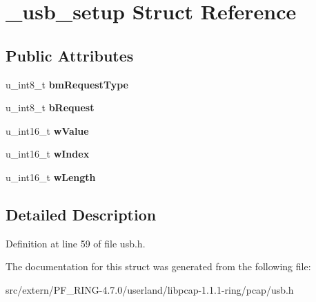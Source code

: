 \hypertarget{struct__usb__setup}{
\section{\_\-usb\_\-setup Struct Reference}
\label{struct__usb__setup}
}
\subsection*{Public Attributes}
\begin{DoxyCompactItemize}
\item 
\hypertarget{struct__usb__setup_a9e17a96ce6bba41e99f19992f541e768}{
u\_\-int8\_\-t {\bfseries bmRequestType}}
\label{struct__usb__setup_a9e17a96ce6bba41e99f19992f541e768}

\item 
\hypertarget{struct__usb__setup_ac1c5e9870b50178f2fe216502ccb36b5}{
u\_\-int8\_\-t {\bfseries bRequest}}
\label{struct__usb__setup_ac1c5e9870b50178f2fe216502ccb36b5}

\item 
\hypertarget{struct__usb__setup_a4eff6a64cdeb67f46c0a9421b782fca7}{
u\_\-int16\_\-t {\bfseries wValue}}
\label{struct__usb__setup_a4eff6a64cdeb67f46c0a9421b782fca7}

\item 
\hypertarget{struct__usb__setup_a87882084f442967016574a7aef07f1af}{
u\_\-int16\_\-t {\bfseries wIndex}}
\label{struct__usb__setup_a87882084f442967016574a7aef07f1af}

\item 
\hypertarget{struct__usb__setup_a2cd093eb927b72b6ba66c98882e7449b}{
u\_\-int16\_\-t {\bfseries wLength}}
\label{struct__usb__setup_a2cd093eb927b72b6ba66c98882e7449b}

\end{DoxyCompactItemize}


\subsection{Detailed Description}


Definition at line 59 of file usb.h.



The documentation for this struct was generated from the following file:\begin{DoxyCompactItemize}
\item 
src/extern/PF\_\-RING-\/4.7.0/userland/libpcap-\/1.1.1-\/ring/pcap/usb.h\end{DoxyCompactItemize}
